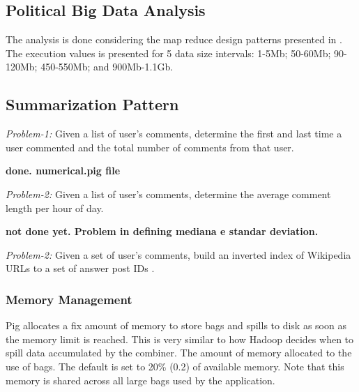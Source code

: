 \subsection{Political Big Data Analysis}
\label{:sec:election-analysis}

% 

The analysis is done considering the map reduce design patterns presented in
\cite{}. The execution values is presented for 5 data size intervals: 1-5Mb;
50-60Mb; 90-120Mb; 450-550Mb; and 900Mb-1.1Gb.
 
\subsection{Summarization Pattern} 
 
\textit{Problem-1:} Given a list of user’s comments, determine the first and
last time a user commented and the total number of comments from that user. 

\textbf{done. numerical.pig file}
             
\textit{Problem-2:} Given a list of user’s comments, determine the average comment length per
hour of day.

\textbf{not done yet. Problem in defining mediana e standar deviation.}
             

\textit{Problem-2:} Given a set of user’s comments, build an inverted index of
Wikipedia URLs to a set of answer post IDs .

\subsubsection{Memory Management}

Pig allocates a fix amount of memory to store bags and spills to disk as soon as
the memory limit is reached. This is very similar to how Hadoop decides when to
spill data accumulated by the combiner. The amount of memory allocated to the
use of bags. The default is set to 20\% (0.2) of available memory. Note that
this memory is shared across all large bags used by the application.    
 